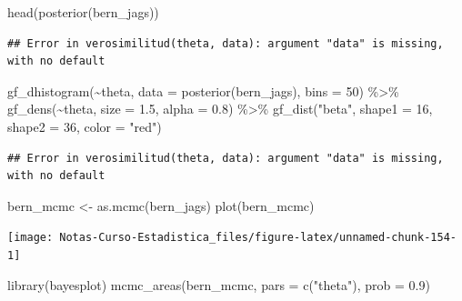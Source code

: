 \documentclass[
  12pt,
]{book}
\newenvironment{Shaded}{\begin{snugshade}}{\end{snugshade}}
\newcommand{\AttributeTok}[1]{\textcolor[rgb]{0.77,0.63,0.00}{#1}}
\newcommand{\DecValTok}[1]{\textcolor[rgb]{0.00,0.00,0.81}{#1}}
\newcommand{\FloatTok}[1]{\textcolor[rgb]{0.00,0.00,0.81}{#1}}
\newcommand{\FunctionTok}[1]{\textcolor[rgb]{0.00,0.00,0.00}{#1}}
\newcommand{\NormalTok}[1]{#1}
\newcommand{\OtherTok}[1]{\textcolor[rgb]{0.56,0.35,0.01}{#1}}
\newcommand{\SpecialCharTok}[1]{\textcolor[rgb]{0.00,0.00,0.00}{#1}}
\newcommand{\StringTok}[1]{\textcolor[rgb]{0.31,0.60,0.02}{#1}}
\theoremstyle{definition}
\theoremstyle{definition}
\theoremstyle{definition}
\theoremstyle{remark}
\begin{document}
\begin{Shaded}
\begin{Highlighting}[]
\FunctionTok{head}\NormalTok{(}\FunctionTok{posterior}\NormalTok{(bern\_jags))}
\end{Highlighting}
\end{Shaded}

\begin{verbatim}
## Error in verosimilitud(theta, data): argument "data" is missing, with no default
\end{verbatim}

\begin{Shaded}
\begin{Highlighting}[]
\FunctionTok{gf\_dhistogram}\NormalTok{(}\SpecialCharTok{\textasciitilde{}}\NormalTok{theta, }\AttributeTok{data =} \FunctionTok{posterior}\NormalTok{(bern\_jags), }
    \AttributeTok{bins =} \DecValTok{50}\NormalTok{) }\SpecialCharTok{\%\textgreater{}\%} \FunctionTok{gf\_dens}\NormalTok{(}\SpecialCharTok{\textasciitilde{}}\NormalTok{theta, }\AttributeTok{size =} \FloatTok{1.5}\NormalTok{, }\AttributeTok{alpha =} \FloatTok{0.8}\NormalTok{) }\SpecialCharTok{\%\textgreater{}\%} 
    \FunctionTok{gf\_dist}\NormalTok{(}\StringTok{"beta"}\NormalTok{, }\AttributeTok{shape1 =} \DecValTok{16}\NormalTok{, }\AttributeTok{shape2 =} \DecValTok{36}\NormalTok{, }\AttributeTok{color =} \StringTok{"red"}\NormalTok{)}
\end{Highlighting}
\end{Shaded}

\begin{verbatim}
## Error in verosimilitud(theta, data): argument "data" is missing, with no default
\end{verbatim}

\begin{Shaded}
\begin{Highlighting}[]
\NormalTok{bern\_mcmc }\OtherTok{\textless{}{-}} \FunctionTok{as.mcmc}\NormalTok{(bern\_jags)}
\FunctionTok{plot}\NormalTok{(bern\_mcmc)}
\end{Highlighting}
\end{Shaded}

\begin{center}\texttt{[image: Notas-Curso-Estadistica\_files/figure-latex/unnamed-chunk-154-1]} \end{center}

\begin{Shaded}
\begin{Highlighting}[]
\FunctionTok{library}\NormalTok{(bayesplot)}
\FunctionTok{mcmc\_areas}\NormalTok{(bern\_mcmc, }\AttributeTok{pars =} \FunctionTok{c}\NormalTok{(}\StringTok{"theta"}\NormalTok{), }\AttributeTok{prob =} \FloatTok{0.9}\NormalTok{)}
\end{Highlighting}
\end{Shaded}
\end{document}
